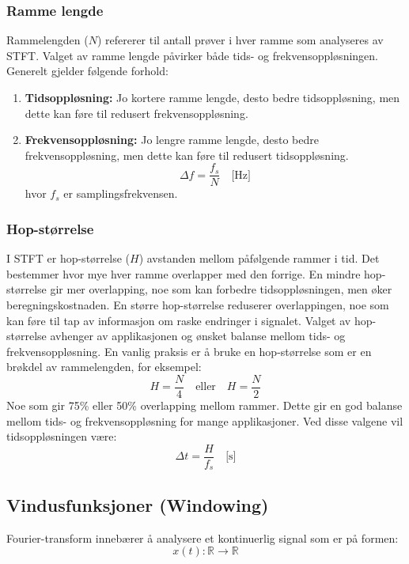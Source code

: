 \subsubsection{Ramme lengde}
Rammelengden ($N$) refererer til antall prøver i hver ramme som analyseres av STFT. Valget av ramme lengde påvirker både tids- og frekvensoppløsningen. Generelt gjelder følgende forhold:

\begin{enumerate}[label=\null]
    \item \textbf{Tidsoppløsning:} Jo kortere ramme lengde, desto bedre tidsoppløsning, men dette kan føre til redusert frekvensoppløsning.\\
    \item \textbf{Frekvensoppløsning:} Jo lengre ramme lengde, desto bedre frekvensoppløsning, men dette kan føre til redusert tidsoppløsning.
    \[
        \Delta f = \frac{f_s}{N} \quad \text{[Hz]}
    \]
    hvor \(f_s\) er samplingsfrekvensen.
\end{enumerate}
\subsubsection{Hop-størrelse}
I STFT er hop-størrelse ($H$) avstanden mellom påfølgende rammer i tid. Det bestemmer hvor mye hver ramme overlapper med den forrige. En mindre hop-størrelse gir mer overlapping, noe som kan forbedre tidsoppløsningen, men øker beregningskostnaden. En større hop-størrelse reduserer overlappingen, noe som kan føre til tap av informasjon om raske endringer i signalet. Valget av hop-størrelse avhenger av applikasjonen og ønsket balanse mellom tids- og frekvensoppløsning. En vanlig praksis er å bruke en hop-størrelse som er en brøkdel av rammelengden, for eksempel:
\[
    H = \frac{N}{4} \quad \text{eller} \quad H = \frac{N}{2}
\]
Noe som gir 75\% eller 50\% overlapping mellom rammer. Dette gir en god balanse mellom tids- og frekvensoppløsning for mange applikasjoner. Ved disse valgene vil tidsoppløsningen være:
\[
    \Delta t = \frac{H}{f_s} \quad \text{[s]}
\]
\clearpage
\noindent
\subsection{Vindusfunksjoner (Windowing)}
Fourier-transform innebærer å analysere et kontinuerlig signal som er på formen:
\[
x(t): \mathbb{R} \rightarrow \mathbb{R}
\]

